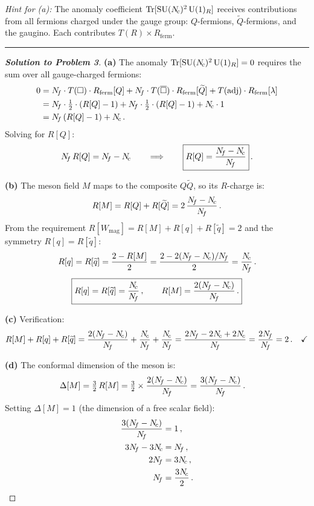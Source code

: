 \documentclass[11pt,a4paper]{article}
\begin{document}
\medskip

\noindent\textit{Hint for (a):} The anomaly coefficient
$\mathrm{Tr}[\mathrm{SU}(N_{\!c})^2\,\mathrm{U}(1)_R]$ receives contributions from all fermions
charged under the gauge group: $Q$-fermions, $\widetilde{Q}$-fermions,
and the gaugino.  Each contributes $T(R) \times R_{\mathrm{ferm}}$.

\bigskip
\hrule
\bigskip

\begin{proof}[\textbf{Solution to Problem 3}]

\textbf{(a)} The anomaly $\mathrm{Tr}[\mathrm{SU}(N_{\!c})^2\,\mathrm{U}(1)_R] = 0$ requires
the sum over all gauge-charged fermions:
\begin{align}
  0 &= N_{\!f} \cdot T(\square) \cdot R_{\mathrm{ferm}}[Q]
  + N_{\!f} \cdot T(\overline{\square}) \cdot R_{\mathrm{ferm}}[\widetilde{Q}]
  + T(\mathrm{adj}) \cdot R_{\mathrm{ferm}}[\lambda] \nonumber \\
  &= N_{\!f} \cdot \tfrac{1}{2} \cdot (R[Q] - 1)
  + N_{\!f} \cdot \tfrac{1}{2} \cdot (R[Q] - 1)
  + N_{\!c} \cdot 1 \nonumber \\
  &= N_{\!f}\,(R[Q] - 1) + N_{\!c}\,.
\end{align}
Solving for $R[Q]$:
\[
  N_{\!f}\, R[Q] = N_{\!f} - N_{\!c}
  \qquad\Longrightarrow\qquad
  \boxed{R[Q] = \frac{N_{\!f} - N_{\!c}}{N_{\!f}}}\,.
\]

\textbf{(b)} The meson field $M$ maps to the composite $Q\widetilde{Q}$,
so its $R$-charge is:
\[
  R[M] = R[Q] + R[\widetilde{Q}] = 2\,\frac{N_{\!f} - N_{\!c}}{N_{\!f}}\,.
\]
From the requirement $R[W_{\mathrm{mag}}] = R[M] + R[q] + R[\widetilde{q}] = 2$
and the symmetry $R[q] = R[\widetilde{q}]$:
\[
  R[q] = R[\widetilde{q}] = \frac{2 - R[M]}{2}
  = \frac{2 - 2(N_{\!f} - N_{\!c})/N_{\!f}}{2}
  = \frac{N_{\!c}}{N_{\!f}}\,.
\]
\[
  \boxed{R[q] = R[\widetilde{q}] = \frac{N_{\!c}}{N_{\!f}}\,,
  \qquad R[M] = \frac{2(N_{\!f} - N_{\!c})}{N_{\!f}}\,.}
\]

\textbf{(c)} Verification:
\[
  R[M] + R[q] + R[\widetilde{q}]
  = \frac{2(\Nf - \Nc)}{\Nf} + \frac{\Nc}{\Nf} + \frac{\Nc}{\Nf}
  = \frac{2\Nf - 2\Nc + 2\Nc}{\Nf}
  = \frac{2\Nf}{\Nf} = 2\,.
  \quad\checkmark
\]

\textbf{(d)} The conformal dimension of the meson is:
\begin{align}
  \Delta[M] &= \tfrac{3}{2}\,R[M]
  = \tfrac{3}{2} \times \frac{2(N_{\!f} - N_{\!c})}{N_{\!f}}
  = \frac{3(N_{\!f} - N_{\!c})}{N_{\!f}}\,.
\end{align}
Setting $\Delta[M] = 1$ (the dimension of a free scalar field):
\begin{align}
  \frac{3(\Nf - \Nc)}{\Nf} &= 1\,, \\
  3\Nf - 3\Nc &= \Nf\,, \\
  2\Nf &= 3\Nc\,, \\
  \Nf &= \frac{3\Nc}{2}\,.
\end{align}


\end{proof}
\end{document}
